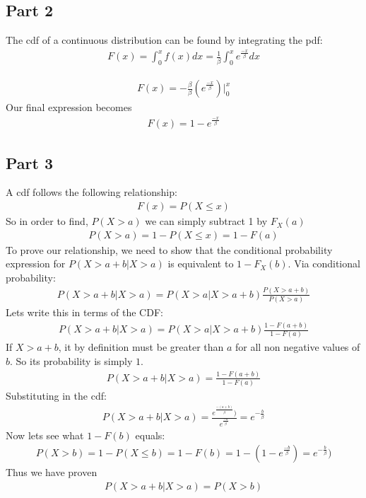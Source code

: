 \documentclass{article}
\begin{document}
\subsection*{Part 2}
The cdf of a continuous distribution can be found by integrating the pdf:
\begin{align*}
F(x) = \int_{0}^{x} f(x) dx = \frac{1}{\beta} \int_{0}^{x} e^{\frac{-x}{\beta}} dx
\end{align*}

\begin{align*}
F(x) = - \frac{\beta}{\beta}(e^{\frac{-x}{\beta}})|_{0}^{x} 
\end{align*}
Our final expression becomes
\begin{align*}
\boxed{F(x) = 1-e^{\frac{-x}{\beta}} }
\end{align*}
\subsection*{Part 3}
A cdf follows the following relationship:
\begin{align*}
F(x) = P(X\leq x)
\end{align*}
So in order to find, $P(X>a)$ we can simply subtract 1 by $F_X(a)$
\begin{align*}
P(X>a) = 1-P(X\leq x) = 1-F(a)
\end{align*}
To prove our relationship, we need to show that the conditional probability expression for $P(X>a+b|X>a)$ is equivalent to $1-F_X(b)$. Via conditional probability:
\begin{align*}
P(X>a+b|X>a) = P(X>a|X>a+b)\frac{P(X>a+b)}{P(X>a)}
\end{align*}
Lets write this in terms of the CDF:
\begin{align*}
P(X>a+b|X>a) = P(X>a|X>a+b)\frac{1-F(a+b)}{1-F(a)}
\end{align*}
If $X>a+b$, it by definition must be greater than $a$ for all non negative values of $b$. So its probability is simply $1$.
\begin{align*}
P(X>a+b|X>a) = \frac{1-F(a+b)}{1-F(a)}
\end{align*}
Substituting in the cdf:
\begin{align*}
P(X>a+b|X>a) = \frac{e^{\frac{-(a+b)}{\beta}})}{e^{\frac{-a}{\beta}}} = e^{-\frac{b}{\beta}}
\end{align*}
Now lets see what $1-F(b)$ equals:
\begin{align*}
P(X>b) = 1-P(X\leq b) = 1-F(b) = 1-(1-e^{\frac{-b}{\beta}}) = e^{-\frac{b}{\beta}})
\end{align*}
Thus we have proven
\begin{align*}
\boxed { P(X>a+b|X>a) = P(X>b) }
\end{align*}
\end{document}
